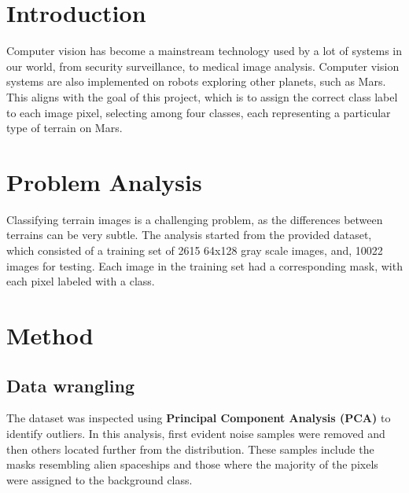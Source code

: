\documentclass[11pt]{article}
\begin{document}
    \begin{multicols}{2}
    
    \section{Introduction}
        Computer vision has become a mainstream technology used by a lot of systems in our world, from security surveillance, to medical image analysis. Computer vision systems are also implemented on robots exploring other planets, such as Mars. 
        This aligns with the goal of this project, which is to assign the correct class label to each image pixel, selecting among four classes, each representing a particular type of terrain on Mars. 
        
    \section{Problem Analysis}
        Classifying terrain images is a challenging problem, as the differences between terrains can be very subtle. The analysis started from the provided dataset, which consisted of a training set of 2615 64x128 gray scale images, and, 10022 images for testing. Each image in the training set had a corresponding mask, with each pixel labeled with a class. 

    
    \section{Method}
        \label{sec:method}
        
        \subsection{Data wrangling}
        \label{sec:wrangling}
        The dataset was inspected using \textbf{Principal Component Analysis (PCA)}  \cite{jolliffe2016principal} to identify outliers.
        In this analysis, first evident noise samples were removed and then others located further from the distribution.
        These samples include the masks resembling alien spaceships and those where the majority of the pixels were assigned to the background class.  
        

\end{multicols}
\end{document}
